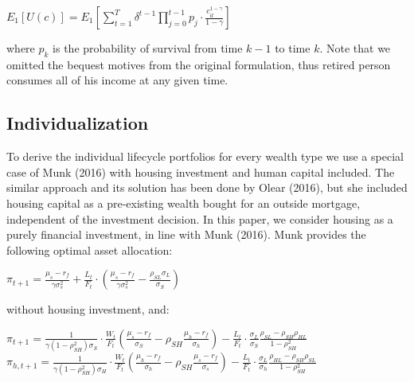 \documentclass[]{elsarticle}
\begin{document}
\begin{center}
	$E_1[U(c)] = E_1 \left[\displaystyle\sum^T_{t=1} \delta^{t-1} \displaystyle\prod^{t-1}_{j=0} p_j \cdot \frac{c^{1-\gamma}_{it}}{1-\gamma}\right]$
\end{center}

where $p_k$ is the probability of survival from time $k-1$ to time $k$. Note that we omitted the bequest motives from the original formulation, thus retired person consumes all of his income at any given time.




\subsection{Individualization}

To derive the individual lifecycle portfolios for every wealth type we use a special case of Munk (2016) with housing investment and human capital included. The similar approach and its solution has been done by Olear (2016), but she included housing capital as a pre-existing wealth bought for an outside mortgage, independent of the investment decision. In this paper, we consider housing as a purely financial investment, in line with Munk (2016). Munk provides the following optimal asset allocation:


\begin{center}
	$\pi_{t+1} = \frac{\mu_s - r_f}{\gamma \sigma^2_s}  + \frac{L_t}{F_t} \cdot \left(\frac{\mu_s - r_f}{\gamma \sigma^2_s} - \frac{\rho_{SL}\sigma_L}{\sigma_S} \right)$
\end{center}

without housing investment, and:

\begin{center}
	$\pi_{t+1} = \frac{1}{\gamma (1 - \rho^2_{SH}) \sigma_S} \cdot \frac{W_t}{F_t} \left( \frac{\mu_s - r_f}{\sigma_S} - \rho_{SH} \frac{\mu_h - r_f}{\sigma_h} \right) - \frac{L_t}{F_t} \cdot \frac{\sigma_L}{\sigma_S} \frac{\rho_{SL} - \rho_{SH}\rho_{HL}}{1 - \rho^2_{SH}}$\\
	$\pi_{h,t+1} = \frac{1}{\gamma (1 - \rho^2_{SH}) \sigma_H} \cdot \frac{W_t}{F_t} \left( \frac{\mu_h - r_f}{\sigma_h} - \rho_{SH} \frac{\mu_s - r_f}{\sigma_s} \right) - \frac{L_t}{F_t} \cdot \frac{\sigma_L}{\sigma_h} \frac{\rho_{HL} - \rho_{SH}\rho_{SL}}{1 - \rho^2_{SH}}$
\end{center}
\end{document}
